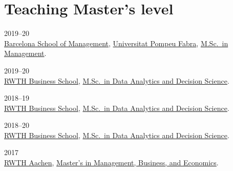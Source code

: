 \section*{Teaching \small{Master's level}}

\begin{paracol}{2}
  \textsc{2019--20}
\switchcolumn
  \\
  \href{https://www.barcelonaschoolofmanagement.upf.edu/en}{Barcelona School of Management}, \href{https://www.upf.edu}{Universitat Pompeu Fabra}, \href{https://www.barcelonaschoolofmanagement.upf.edu/en/master-of-science-in-management-specialization-in-business-analytics/study-plan}{M.Sc.\ in Management}.
\end{paracol}

\begin{paracol}{2}
  \textsc{2019--20}
\switchcolumn
  \\
  \href{https://www.business-school.rwth-aachen.de/en/}{RWTH Business School}, \href{https://www.business-school.rwth-aachen.de/en/programs/degree-programs/mme-dds/overview}{M.Sc.\ in Data Analytics and Decision Science}.
\end{paracol}

\begin{paracol}{2}
  \textsc{2018--19}
\switchcolumn
  \\
  \href{https://www.business-school.rwth-aachen.de/en/}{RWTH Business School}, \href{https://www.business-school.rwth-aachen.de/en/programs/degree-programs/mme-dds/overview}{M.Sc.\ in Data Analytics and Decision Science}.
\end{paracol}

\begin{paracol}{2}
  \textsc{2018--20}
\switchcolumn
  \\
  \href{https://www.business-school.rwth-aachen.de/en/}{RWTH Business School}, \href{https://www.business-school.rwth-aachen.de/en/programs/degree-programs/mme-dds/overview}{M.Sc.\ in Data Analytics and Decision Science}.
\end{paracol}

\begin{paracol}{2}
  \textsc{2017}
\switchcolumn
  \\
  \href{http://www.rwth-aachen.de/}{RWTH Aachen}, \href{http://www.wiwi.rwth-aachen.de/cms/Wirtschaftswissenschaften/Studium/Studiengaenge/Masterstudiengaenge/~camq/Wirtschaftswissenschaft-M-Sc-/?lidx=1}{Master's in Management, Business, and Economics}.
\end{paracol}

